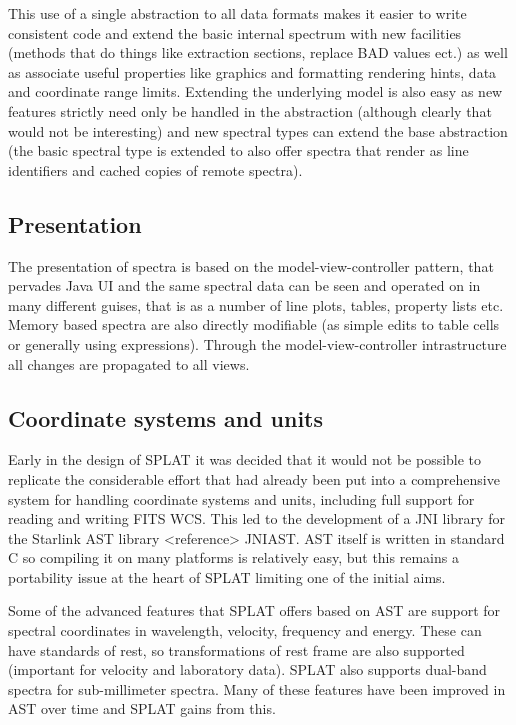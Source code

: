 \documentclass[final,authoryear,5p,times,twocolumn]{elsarticle}
\begin{document}
This use of a single abstraction to all data formats makes it easier to write
consistent code and extend the basic internal spectrum with new facilities
(methods that do things like extraction sections, replace BAD values ect.) as
well as associate useful properties like graphics and formatting rendering
hints, data and coordinate range limits. Extending the underlying model is
also easy as new features strictly need only be handled in the abstraction
(although clearly that would not be interesting) and new spectral types can
extend the base abstraction (the basic spectral type is extended to also offer
spectra that render as line identifiers and cached copies of remote spectra).


\subsection{Presentation}

The presentation of spectra is based on the model-view-controller pattern,
that pervades Java UI and the same spectral data can be seen and operated on
in many different guises, that is as a number of line plots, tables, property
lists etc. Memory based spectra are also directly modifiable (as simple edits
to table cells or generally using expressions). Through the
model-view-controller intrastructure all changes are propagated to all views.


\subsection{Coordinate systems and units}

Early in the design of SPLAT it was decided that it would not be possible to
replicate the considerable effort that had already been put into a
comprehensive system for handling coordinate systems and units, including full
support for reading and writing FITS WCS. This led to the development of a JNI
library for the Starlink AST library <reference> JNIAST. AST itself is written
in standard C so compiling it on many platforms is relatively easy, but this
remains a portability issue at the heart of SPLAT limiting one of the initial
aims.

Some of the advanced features that SPLAT offers based on AST are support for
spectral coordinates in wavelength, velocity, frequency and energy. These can
have standards of rest, so transformations of rest frame are also supported
(important for velocity and laboratory data). SPLAT also supports dual-band
spectra for sub-millimeter spectra. Many of these features have been improved
in AST over time and SPLAT gains from this.
\end{document}
